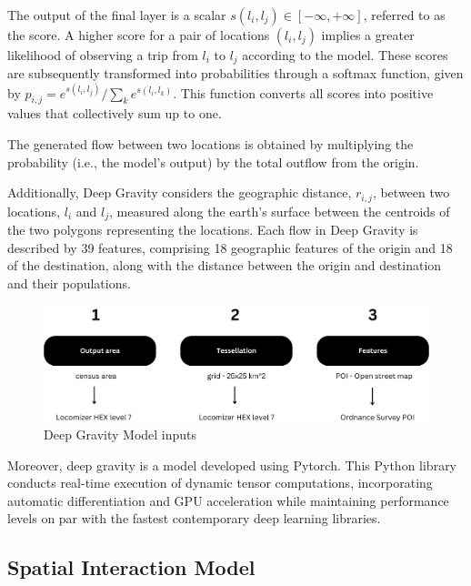 The output of the final layer is a scalar \(s(l_i, l_j) \in [-\infty, +\infty]\), referred to as the score. A higher score for a pair of locations \((l_i, l_j)\) implies a greater likelihood of observing a trip from \(l_i\) to \(l_j\) according to the model. These scores are subsequently transformed into probabilities through a softmax function, given by \(p_{i,j} = e^{s(l_i, l_j)}/\sum_ke^{s(l_i, l_k)}\). This function converts all scores into positive values that collectively sum up to one.

The generated flow between two locations is obtained by multiplying the probability (i.e., the model's output) by the total outflow from the origin.

Additionally, Deep Gravity considers the geographic distance, $r_{i,j}$, between two locations, $l_i$ and $l_j$, measured along the earth's surface between the centroids of the two polygons representing the locations. Each flow in Deep Gravity is described by 39 features, comprising 18 geographic features of the origin and 18 of the destination, along with the distance between the origin and destination and their populations.

    \begin{figure}[H]
        \centering
        \includegraphics[width=14cm]{Images/DG_Input.png}
        \caption{Deep Gravity Model inputs}
        \label{fig: DG_input}
    \end{figure}

Moreover, deep gravity\citep{siminiDeepGravityModel2021} is a model developed using Pytorch. This Python library conducts real-time execution of dynamic tensor computations, incorporating automatic differentiation and GPU acceleration while maintaining performance levels on par with the fastest contemporary deep learning libraries\citep{paszkePyTorchImperativeStyle2019}.  
    

\subsection{Spatial Interaction Model}

